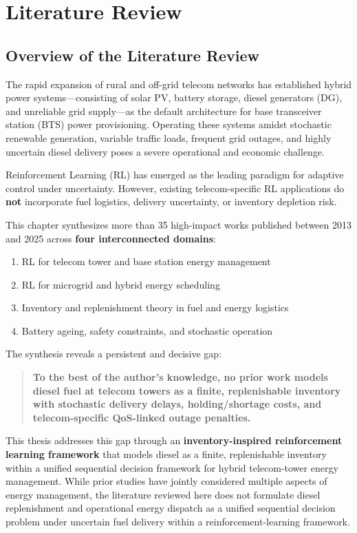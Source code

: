 \chapter{Literature Review}
\label{chap:literature}

\section{Overview of the Literature Review}

The rapid expansion of rural and off-grid telecom networks has established hybrid power systems—consisting of solar PV, battery storage, diesel generators (DG), and unreliable grid supply—as the default architecture for base transceiver station (BTS) power provisioning. Operating these systems amidst stochastic renewable generation, variable traffic loads, frequent grid outages, and highly uncertain diesel delivery poses a severe operational and economic challenge.

Reinforcement Learning (RL) has emerged as the leading paradigm for adaptive control under uncertainty. However, existing telecom-specific RL applications do \textbf{not} incorporate fuel logistics, delivery uncertainty, or inventory depletion risk.

This chapter synthesizes more than 35 high-impact works published between 2013 and 2025 across \textbf{four interconnected domains}:

\begin{enumerate}
    \item RL for telecom tower and base station energy management
    \item RL for microgrid and hybrid energy scheduling
    \item Inventory and replenishment theory in fuel and energy logistics
    \item Battery ageing, safety constraints, and stochastic operation
\end{enumerate}

The synthesis reveals a persistent and decisive gap:

\begin{quote}
\textbf{To the best of the author's knowledge, no prior work models diesel fuel
at telecom towers as a finite, replenishable inventory with stochastic delivery
delays, holding/shortage costs, and telecom-specific QoS-linked outage penalties.}
\end{quote}

This thesis addresses this gap through an \textbf{inventory-inspired
reinforcement learning framework} that models diesel as a finite,
replenishable inventory within a unified sequential decision framework
for hybrid telecom-tower energy management. While prior studies have
jointly considered multiple aspects of energy management, the literature
reviewed here does not formulate diesel replenishment and operational
energy dispatch as a unified sequential decision problem under uncertain
fuel delivery within a reinforcement-learning framework.

